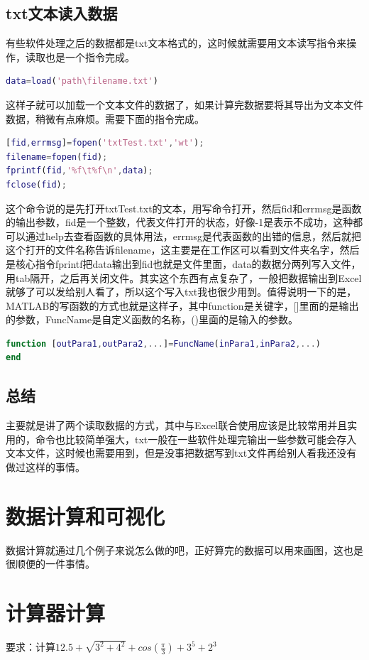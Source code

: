 \documentclass{hfutpaper}
\begin{document}
\subsection*{txt文本读入数据}
有些软件处理之后的数据都是txt文本格式的，这时候就需要用文本读写指令来操作，读取也是一个指令完成。
\begin{lstlisting}[language=matlab]
	data=load('path\filename.txt')
\end{lstlisting}
这样子就可以加载一个文本文件的数据了，如果计算完数据要将其导出为文本文件数据，稍微有点麻烦。需要下面的指令完成。
\begin{lstlisting}[language=matlab]
[fid,errmsg]=fopen('txtTest.txt','wt');		
filename=fopen(fid);
fprintf(fid,'%f\t%f\n',data);
fclose(fid);
\end{lstlisting}
这个命令说的是先打开txtTest.txt的文本，用写命令打开，然后fid和errmsg是函数的输出参数，fid是一个整数，代表文件打开的状态，好像-1是表示不成功，这种都可以通过help去查看函数的具体用法，errmsg是代表函数的出错的信息，然后就把这个打开的文件名称告诉filename，这主要是在工作区可以看到文件夹名字，然后是核心指令fprintf把data输出到fid也就是文件里面，data的数据分两列写入文件，用tab隔开，之后再关闭文件。其实这个东西有点复杂了，一般把数据输出到Excel就够了可以发给别人看了，所以这个写入txt我也很少用到。值得说明一下的是，MATLAB的写函数的方式也就是这样子，其中function是关键字，[]里面的是输出的参数，FuncName是自定义函数的名称，()里面的是输入的参数。
\begin{lstlisting}[language=matlab]
function [outPara1,outPara2,...]=FuncName(inPara1,inPara2,...)
end
\end{lstlisting}
\subsection{总结}
主要就是讲了两个读取数据的方式，其中与Excel联合使用应该是比较常用并且实用的，命令也比较简单强大，txt一般在一些软件处理完输出一些参数可能会存入文本文件，这时候也需要用到，但是没事把数据写到txt文件再给别人看我还没有做过这样的事情。\blacksmiley
\section{数据计算和可视化}
数据计算就通过几个例子来说怎么做的吧，正好算完的数据可以用来画图，这也是很顺便的一件事情。
\section*{计算器计算}
要求：计算$12.5+\sqrt{3^2+4^2}+cos(\frac{\pi}{3})+3^5+2^3$
\end{document}
